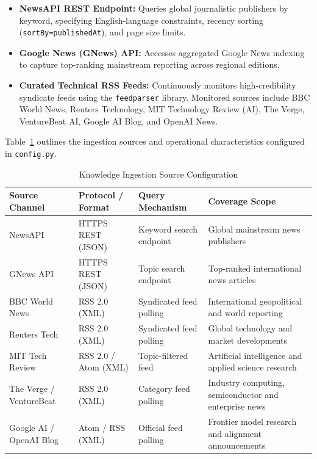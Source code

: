 \begin{itemize}
    \item \textbf{NewsAPI REST Endpoint:} Queries global journalistic publishers by keyword, specifying English-language constraints, recency sorting (\texttt{sortBy=publishedAt}), and page size limits.
    \item \textbf{Google News (GNews) API:} Accesses aggregated Google News indexing to capture top-ranking mainstream reporting across regional editions.
    \item \textbf{Curated Technical RSS Feeds:} Continuously monitors high-credibility syndicate feeds using the \texttt{feedparser} library. Monitored sources include BBC World News, Reuters Technology, MIT Technology Review (AI), The Verge, VentureBeat AI, Google AI Blog, and OpenAI News.
\end{itemize}

Table~\ref{tab:news_sources} outlines the ingestion sources and operational characteristics configured in \texttt{config.py}.

\begin{table}[H]
\centering
\caption{Knowledge Ingestion Source Configuration}
\label{tab:news_sources}
\small
\renewcommand{\arraystretch}{1.3}
\begin{tabularx}{\linewidth}{|l|p{3.2cm}|p{2.8cm}|X|}
\hline
\textbf{Source Channel} & \textbf{Protocol / Format} & \textbf{Query Mechanism} & \textbf{Coverage Scope} \\
\hline
NewsAPI & HTTPS REST (JSON) & Keyword search endpoint & Global mainstream news publishers \\
\hline
GNews API & HTTPS REST (JSON) & Topic search endpoint & Top-ranked international news articles \\
\hline
BBC World News & RSS 2.0 (XML) & Syndicated feed polling & International geopolitical and world reporting \\
\hline
Reuters Tech & RSS 2.0 (XML) & Syndicated feed polling & Global technology and market developments \\
\hline
MIT Tech Review & RSS 2.0 / Atom (XML) & Topic-filtered feed & Artificial intelligence and applied science research \\
\hline
The Verge / VentureBeat & RSS 2.0 (XML) & Category feed polling & Industry computing, semiconductor and enterprise news \\
\hline
Google AI / OpenAI Blog & Atom / RSS (XML) & Official feed polling & Frontier model research and alignment announcements \\
\hline
\end{tabularx}
\end{table}

